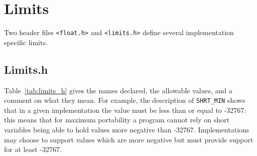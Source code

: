   

 
        \section{Limits}
        

  

  Two header files \texttt{<float.h>} and
   \texttt{<limits.h>} define several implementation specific
   limits.


  \subsection{Limits.h}
   

   Table~\ref{tab:limits_h} gives the names declared, the allowable values,
    and a comment on what they mean.  For example, the
    description of \texttt{SHRT\_MIN} shows that in a given implementation
    the value must be less than or equal to -32767: this means
    that for maximum portability a program cannot rely on short
    variables being able to hold values more negative than
    -32767.  Implementations may choose to support values which
    are more negative but must provide support for at least
    -32767.


    
